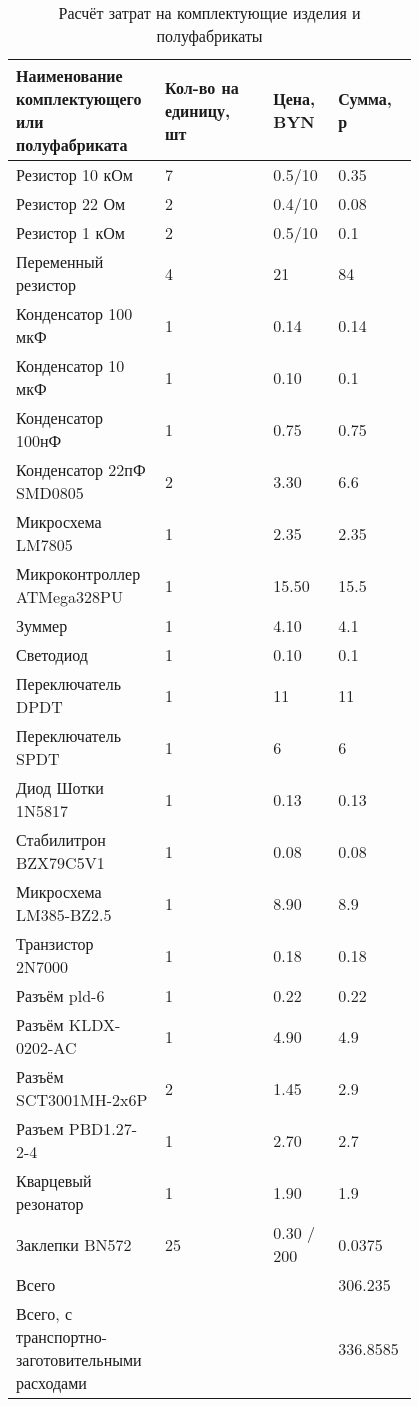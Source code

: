 \begin{table}[H]
  \caption{Расчёт затрат на комплектующие изделия и полуфабрикаты}
  \small
  \begin{tabular}{| p{0.25\linewidth} |  p{0.25\linewidth} |  p{0.15\linewidth} |  p{0.15\linewidth} |}
    \hline
Наименование комплектующего или полуфабриката & Кол-во на единицу, шт & Цена, BYN & Сумма, р\\[0pt]
\hline
  Резистор 10 кОм & 7 & 0.5/10 & 0.35 \\[0pt]
  \hline
  Резистор 22 Ом  & 2 & 0.4/10 & 0.08 \\[0pt]
  \hline
  Резистор 1 кОм  & 2 & 0.5/10 & 0.1\\[0pt]
  \hline
  Переменный резистор & 4 & 21 & 84\\[0pt]
  \hline
  Конденсатор 100 мкФ & 1 & 0.14 & 0.14\\[0pt]
  \hline
  Конденсатор 10 мкФ  & 1 & 0.10 & 0.1\\[0pt]
  \hline
  Конденсатор 100нФ & 1 & 0.75 & 0.75 \\[0pt]
  \hline
  Конденсатор 22пФ SMD0805 & 2 & 3.30 & 6.6\\[0pt]
  \hline
  Микросхема LM7805 & 1 & 2.35 & 2.35 \\[0pt]
  \hline
  Микроконтроллер ATMega328PU & 1 & 15.50 & 15.5 \\[0pt]
  \hline
  Зуммер & 1 & 4.10 & 4.1 \\[0pt]
  \hline
  Светодиод & 1 & 0.10 & 0.1 \\[0pt]
  \hline
  Переключатель DPDT & 1 & 11 & 11 \\[0pt]
  \hline
  Переключатель SPDT & 1 & 6 & 6\\[0pt]
  \hline
  Диод Шотки 1N5817 & 1 & 0.13 & 0.13 \\[0pt]
  \hline
  Стабилитрон BZX79C5V1 & 1 & 0.08 & 0.08 \\[0pt]
  \hline
  Микросхема LM385-BZ2.5 & 1 & 8.90 & 8.9\\[0pt]
  \hline
  Транзистор 2N7000 & 1 & 0.18 & 0.18 \\[0pt]
  \hline
  Разъём pld-6 & 1 & 0.22 & 0.22 \\[0pt]
  \hline
  Разъём KLDX-0202-AC & 1 & 4.90 & 4.9 \\[0pt]
  \hline
  Разъём SCT3001MH-2x6P & 2 & 1.45 & 2.9 \\[0pt]
  \hline
  Разъем PBD1.27-2-4 & 1 & 2.70 & 2.7 \\[0pt]
  \hline
  Кварцевый резонатор & 1 & 1.90 & 1.9\\[0pt]
  \hline
  Заклепки BN572 & 25 & 0.30 / 200 & 0.0375\\[0pt]
  \hline
  Всего &  &  & 306.235\\[0pt]
  \hline
  Всего, с транспортно-заготовительными расходами &  &  & 336.8585\\[0pt]
  \hline
\end{tabular}
\end{table}

